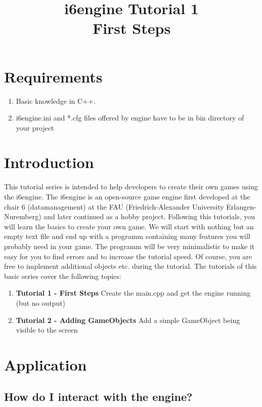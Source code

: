 \documentclass{article}
\title{i6engine Tutorial 1 \\ First Steps}
\begin{document}
\section{Requirements}


\begin{enumerate}
\item Basic knowledge in C++.
\item i6engine.ini and *.cfg files offered by engine have to be in bin directory of your project
\end{enumerate}

\section{Introduction}

This tutorial series is intended to help developers to create their own games using the i6engine. The i6engine is an open-source game engine first developed at the chair 6 (datamanagement) at the FAU (Friedrich-Alexander University Erlangen-Nuremberg) and later continued as a hobby project.\newline
Following this tutorials, you will learn the basics to create your own game. We will start with nothing but an empty text file and end up with a programm containing many features you will probably need in your game. The programm will be very minimalistic to make it easy for you to find errors and to increase the tutorial speed. Of course, you are free to implement additional objects etc. during the tutorial.\newline
The tutorials of this basic series cover the following topics:\newline
\begin{enumerate}
\item \textbf{Tutorial 1 - First Steps} Create the main.cpp and get the engine running (but no output)
\item \textbf{Tutorial 2 - Adding GameObjects} Add a simple GameObject being visible to the screen
\end{enumerate}

\section{Application}

\subsection{How do I interact with the engine?}
\end{document}

